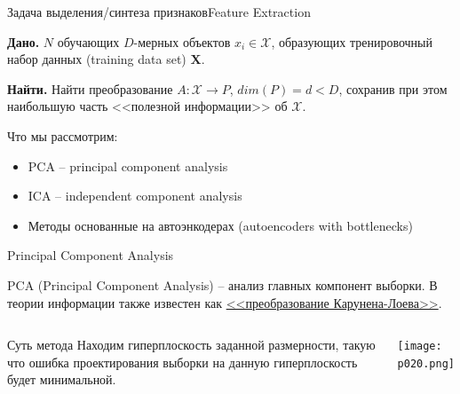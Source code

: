 \documentclass[pdf, intlimits, 9pt, unicode]{beamer}
\begin{document}
\begin{frame}{Задача выделения/синтеза признаков}{Feature Extraction}

\textbf{Дано.} $N$ обучающих $D$-мерных объектов $x_i \in \mathscr{X}$, образующих тренировочный набор данных (training data set) $\mathbf{X}$.\pause

\textbf{Найти.} Найти преобразование $A : \mathscr{X} \to P$, $dim(P) = d < D$, сохранив при этом наибольшую часть <<полезной информации>> об $\mathscr{X}$.\pause

Что мы рассмотрим:

\begin{itemize}
\item PCA -- principal component analysis\pause
\item ICA -- independent component analysis\pause
\item Методы основанные на автоэнкодерах (autoencoders with bottlenecks)
\end{itemize}

\end{frame}





\begin{frame}{Principal Component Analysis}

PCA (Principal Component Analysis) -- анализ главных компонент выборки. В теории информации также известен как \href{http://ru.wikipedia.org/wiki/Теорема_Карунена_—_Лоэва}{<<преобразование Карунена-Лоева>>}.\pause
\bigskip

\begin{columns}[c,onlytextwidth]
\begin{block}{Суть метода}
Находим гиперплоскость заданной размерности, такую что ошибка проектирования выборки на данную гиперплоскость будет минимальной.
\end{block}

\texttt{[image: p020.png]}
\end{columns}
\end{frame}
\end{document}
